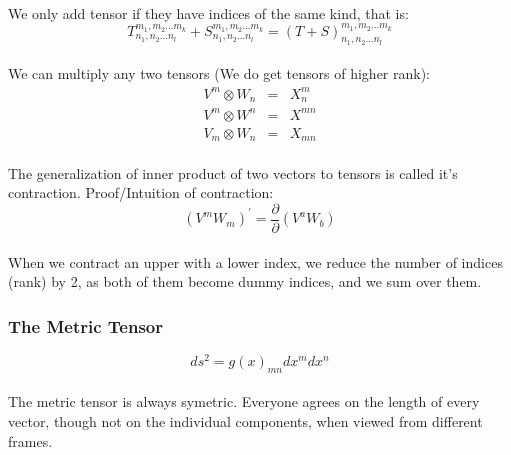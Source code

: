 \paragraph{} We only add tensor if they have indices of the same kind, that is:
\begin{equation}
  T^{m_1,m_2...m_k}_{n_1,n_2...n_l} + S^{m_1,m_2...m_k}_{n_1,n_2...n_l} = (T + S)^{m_1,m_2...m_k}_{n_1,n_2...n_l}
\end{equation}

\paragraph{} We can multiply any two tensors (We do get tensors of higher rank):
\begin{eqnarray}
  V^m \otimes W_n &=& X^m_n  \\
  V^m \otimes W^n &=& X^{mn} \\
  V_m \otimes W_n &=& X_{mn}
\end{eqnarray}

\paragraph{} The generalization of inner product of two vectors to tensors is called it's contraction.
Proof/Intuition of contraction:
\begin{equation}
  (V^m W_m)^\prime = \frac{\partial }{\partial} (V^a W_b)
\end{equation}
\paragraph{} When we contract an upper with a lower index, we reduce the number of indices (rank) by 2, as both of them become dummy indices, and we sum over them.

\subsubsection{The Metric Tensor}

\begin{equation}
  ds^2 = g(x)_{mn} dx^m dx^n
\end{equation}
\paragraph{} The metric tensor is always symetric. Everyone agrees on the length of every vector, though not on the individual components, when viewed from different frames.

